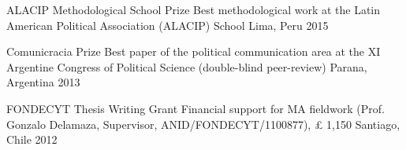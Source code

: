 


\begin{cvhonors}
\cvhonor
{ALACIP Methodological School Prize}
{Best methodological work at the Latin American Political Association (ALACIP) School}
{Lima, Peru}
{2015}
\end{cvhonors}

\vspace{1mm}





\begin{cvhonors}
\cvhonor
{Comunicracia Prize}
{Best paper of the political communication area at the XI Argentine Congress of Political Science (double-blind peer-review)} %
{Parana, Argentina}
{2013}
\end{cvhonors}

\vspace{1mm}



\begin{cvhonors}
\cvhonor
{FONDECYT Thesis Writing Grant}
{Financial support for MA fieldwork (Prof. Gonzalo Delamaza, Supervisor, ANID/FONDECYT/1100877), {\pounds} 1,150}
{Santiago, Chile}
{2012}
\end{cvhonors}

\vspace{1mm}
